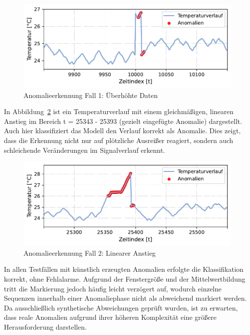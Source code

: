 \begin{figure}[htbp]
    \centering
        \includegraphics[width=1\textwidth]{Bilder/Ergebnisse/KI/Fall1.pdf}
        \vspace{-2em}
    \caption{Anomalieerkennung Fall 1: Überhöhte Daten}
    \label{fig:Fall1}
\end{figure}

In Abbildung~\ref{fig:Fall2} ist ein Temperaturverlauf mit einem gleichmäßigen, linearen Anstieg im Bereich t = 25343 - 25393 (gezielt eingefügte Anomalie) dargestellt. 
Auch hier klassifiziert das Modell den Verlauf korrekt als Anomalie. 
Dies zeigt, dass die Erkennung nicht nur auf plötzliche Ausreißer reagiert, sondern auch schleichende Veränderungen im Signalverlauf erkennt.


\begin{figure}[htbp]
    \centering
        \includegraphics[width=1\textwidth]{Bilder/Ergebnisse/KI/Fall2.pdf}
        \vspace{-2em}
    \caption{Anomalieerkennung Fall 2: Linearer Anstieg}
    
    \label{fig:Fall2}
\end{figure}

In allen Testfällen mit künstlich erzeugten Anomalien erfolgte die Klassifikation korrekt, ohne Fehlalarme. 
Aufgrund der Fenstergröße und der Mittelwertbildung tritt die Markierung jedoch häufig leicht verzögert auf, wodurch einzelne Sequenzen innerhalb einer Anomaliephase nicht als abweichend markiert werden. 
Da ausschließlich synthetische Abweichungen geprüft wurden, ist zu erwarten, dass reale Anomalien aufgrund ihrer höheren Komplexität eine größere Herausforderung darstellen.

